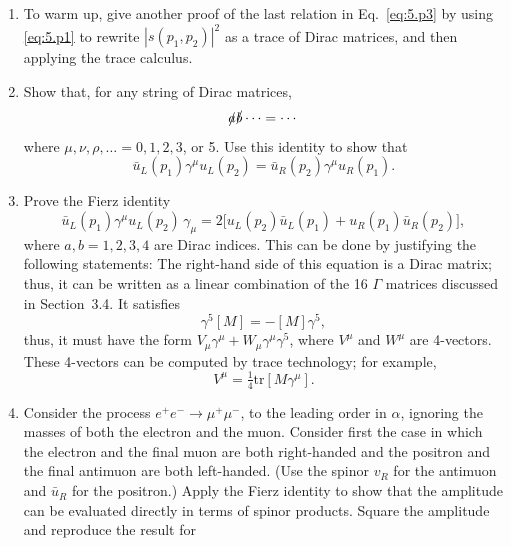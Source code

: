 \begin{enumerate}[label=(\alph*)]
  \item To warm up, give another proof of the last relation in Eq.~\eqref{eq:5.p3}
    by using \eqref{eq:5.p1} to rewrite $|s(p_1,p_2)|^2$ as a trace of Dirac
    matrices, and then applying the trace calculus.
  \item Show that, for any string of Dirac matrices,
    \begin{equation}
      \slashed{a}\slashed{b}\cdots = \cdots
    \end{equation}
    where $\mu, \nu, \rho, \ldots = 0, 1, 2, 3$, or 5.  Use this identity to
    show that
    \begin{equation}
      \bar{u}_L(p_1)\gamma^\mu u_L(p_2)
        = \bar{u}_R(p_2)\gamma^\mu u_R(p_1) .
    \end{equation}
  \item Prove the Fierz identity
    \begin{equation}
      \bar{u}_L(p_1)\gamma^\mu u_L(p_2)\,\gamma_\mu = 2\bigl[
        u_L(p_2)\bar{u}_L(p_1) + u_R(p_1)\bar{u}_R(p_2) \bigr],
    \end{equation}
    where $a, b = 1, 2, 3, 4$ are Dirac indices.  This can be done by
    justifying the following statements: The right-hand side of this equation
    is a Dirac matrix; thus, it can be written as a linear combination of the
    16 $\Gamma$ matrices discussed in Section~3.4.  It satisfies
    \begin{equation}
      \gamma^5[M] = -[M]\gamma^5,
    \end{equation}
    thus, it must have the form $V_\mu\gamma^\mu + W_\mu\gamma^\mu\gamma^5$,
    where $V^\mu$ and $W^\mu$ are 4-vectors.  These 4-vectors can be computed
    by trace technology; for example,
    \begin{equation}
      V^\mu = \tfrac{1}{4}\mathrm{tr}[M\gamma^\mu] .
    \end{equation}
  \item Consider the process $e^{+}e^{-}\to\mu^{+}\mu^{-}$, to the leading
    order in $\alpha$, ignoring the masses of both the electron and the muon.
    Consider first the case in which the electron and the final muon are both
    right-handed and the positron and the final antimuon are both left-handed.
    (Use the spinor $v_R$ for the antimuon and $\bar{u}_R$ for the positron.)
    Apply the Fierz identity to show that the amplitude can be evaluated
    directly in terms of spinor products.  Square the amplitude and reproduce
    the result for

\end{enumerate}
